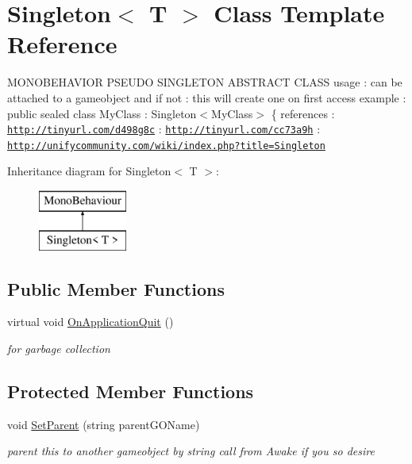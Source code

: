 \hypertarget{class_singleton}{}\section{Singleton$<$ T $>$ Class Template Reference}
\label{class_singleton}


M\+O\+N\+O\+B\+E\+H\+A\+V\+I\+OR P\+S\+E\+U\+DO S\+I\+N\+G\+L\+E\+T\+ON A\+B\+S\+T\+R\+A\+CT C\+L\+A\+SS usage \+: can be attached to a gameobject and if not \+: this will create one on first access example \+: \textquotesingle{}\textquotesingle{}\textquotesingle{}public sealed class My\+Class \+: Singleton$<$\+My\+Class$>$ \{\textquotesingle{}\textquotesingle{}\textquotesingle{} references \+: \href{http://tinyurl.com/d498g8c}{\tt http\+://tinyurl.\+com/d498g8c} \+: \href{http://tinyurl.com/cc73a9h}{\tt http\+://tinyurl.\+com/cc73a9h} \+: \href{http://unifycommunity.com/wiki/index.php?title=Singleton}{\tt http\+://unifycommunity.\+com/wiki/index.\+php?title=\+Singleton}  


Inheritance diagram for Singleton$<$ T $>$\+:\begin{figure}[H]
\begin{center}
\leavevmode
\includegraphics[height=2.000000cm]{class_singleton}
\end{center}
\end{figure}
\subsection*{Public Member Functions}
\begin{DoxyCompactItemize}
\item 
virtual void \hyperlink{class_singleton_a4f8894426fcc37471cb7f8d04574e08f}{On\+Application\+Quit} ()
\begin{DoxyCompactList}\small\item\em for garbage collection \end{DoxyCompactList}\end{DoxyCompactItemize}
\subsection*{Protected Member Functions}
\begin{DoxyCompactItemize}
\item 
void \hyperlink{class_singleton_ade3da30710f7941729603c5d60dbf979}{Set\+Parent} (string parent\+G\+O\+Name)
\begin{DoxyCompactList}\small\item\em parent this to another gameobject by string call from Awake if you so desire \end{DoxyCompactList}\end{DoxyCompactItemize}
